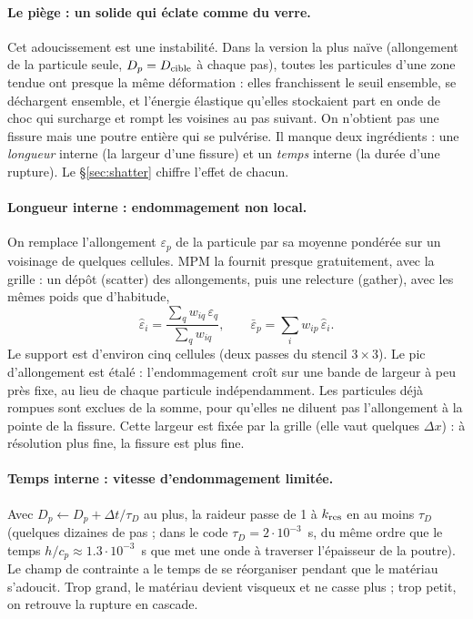 \documentclass[11pt,a4paper]{article}
\begin{document}
\paragraph{Le piège : un solide qui éclate comme du verre.} Cet adoucissement est une instabilité.
Dans la version la plus naïve (allongement de la particule seule, $D_p = D_{\rm cible}$ à chaque
pas), toutes les particules d'une zone tendue ont presque la même déformation : elles franchissent
le seuil ensemble, se déchargent ensemble, et l'énergie élastique qu'elles stockaient part en onde
de choc qui surcharge et rompt les voisines au pas suivant. On n'obtient pas une fissure mais une
poutre entière qui se pulvérise. Il manque deux ingrédients : une \emph{longueur} interne (la
largeur d'une fissure) et un \emph{temps} interne (la durée d'une rupture). Le
\S\ref{sec:shatter} chiffre l'effet de chacun.

\paragraph{Longueur interne : endommagement non local.} On remplace l'allongement $\varepsilon_p$ de la
particule par sa moyenne pondérée sur un voisinage de quelques cellules. MPM la fournit presque
gratuitement, avec la grille : un dépôt (scatter) des allongements, puis une relecture (gather),
avec les mêmes poids que d'habitude,
\[
  \hat\varepsilon_i = \frac{\sum_q w_{iq}\,\varepsilon_q}{\sum_q w_{iq}},
  \qquad
  \bar\varepsilon_p = \sum_i w_{ip}\,\hat\varepsilon_i .
\]
Le support est d'environ cinq cellules (deux passes du stencil $3\times3$). Le pic d'allongement est
étalé : l'endommagement croît sur une bande de largeur à peu près fixe, au lieu de chaque particule
indépendamment. Les particules déjà rompues sont exclues de la somme, pour qu'elles ne diluent
pas l'allongement à la pointe de la fissure. Cette largeur est fixée par la grille (elle vaut
quelques $\Delta x$) : à résolution plus fine, la fissure est plus fine.

\paragraph{Temps interne : vitesse d'endommagement limitée.} Avec $D_p \leftarrow D_p + \Delta t/\tau_D$
au plus, la raideur passe de 1 à $k_{\rm res}$ en au moins $\tau_D$ (quelques dizaines de pas ; dans
le code $\tau_D = 2\cdot10^{-3}$~s, du même ordre que le temps $h/c_p \approx 1.3\cdot10^{-3}$~s que
met une onde à traverser l'épaisseur de la poutre). Le champ de contrainte a le temps de se
réorganiser pendant que le matériau s'adoucit. Trop grand, le matériau devient visqueux et ne
casse plus ; trop petit, on retrouve la rupture en cascade.
\end{document}
